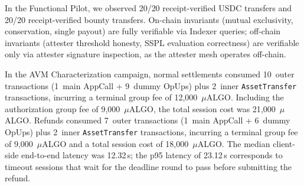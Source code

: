 \documentclass[journal]{IEEEtran}
\begin{document}
In the Functional Pilot, we observed 20/20 receipt-verified USDC
transfers and 20/20 receipt-verified bounty transfers.
On-chain invariants (mutual exclusivity, conservation, single
payout) are fully verifiable via Indexer queries; off-chain
invariants (attester threshold honesty, SSPL evaluation correctness)
are verifiable only via attester signature inspection, as the
attester mesh operates off-chain.

In the AVM Characterization campaign, normal settlements consumed
10~outer transactions (1~main AppCall + 9~dummy OpUps) plus
2~inner \texttt{AssetTransfer} transactions, incurring a terminal
group fee of 12{,}000~$\mu$ALGO.
Including the authorization group fee of 9{,}000~$\mu$ALGO, the
total session cost was 21{,}000~$\mu$ALGO.
Refunds consumed 7~outer transactions (1~main AppCall + 6~dummy
OpUps) plus 2~inner \texttt{AssetTransfer} transactions, incurring
a terminal group fee of 9{,}000~$\mu$ALGO and a total session cost
of 18{,}000~$\mu$ALGO.
The median client-side end-to-end latency was 12.32\,s; the p95
latency of 23.12\,s corresponds to timeout sessions that wait for
the deadline round to pass before submitting the refund.

\begin{table}[h]
\centering
\caption{Algorand Testnet Functional Pilot and AVM Characterization
results}
\label{tab:pilot}
\end{table}
\end{document}
